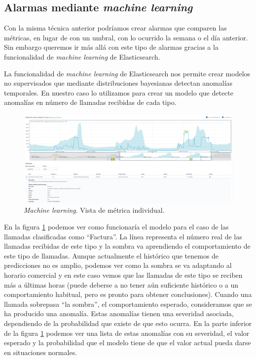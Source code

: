\subsection{Alarmas mediante \textit{machine learning}}
Con la misma técnica anterior podríamos crear alarmas que comparen las métricas, en lugar de con un umbral, con lo ocurrido la semana o el día anterior. Sin embargo queremos ir más allá con este tipo de alarmas gracias a la funcionalidad de \textit{machine learning} de Elasticsearch. 

La funcionalidad de \textit{machine learning} de Elasticsearch nos permite crear modelos no supervisados que mediante distribuciones bayesianas detectan anomalías temporales. En nuestro caso lo utilizamos para crear un modelo que detecte anomalías en número de llamadas recibidas de cada tipo.  



\begin{figure}[!ht]
	\centering
	\includegraphics[width=1\textwidth]{images/serv/ml-factura}
	\caption{\textit{Machine learning}. Vista de métrica individual.}
	\label{fig:mlfactura}
\end{figure}

En la figura \ref{fig:mlfactura} podemos ver como funcionaría el modelo para el caso de las llamadas clasificadas como ``Factura''. La línea representa el número real de las llamadas recibidas de este tipo y la sombra va aprendiendo el comportamiento de este tipo de llamadas.  Aunque actualmente el histórico que tenemos de predicciones no es amplio, podemos ver como la sombra se va adaptando al horario comercial y en este caso vemos que las llamadas de este tipo se reciben más a últimas horas (puede deberse a no tener aún suficiente histórico o a un comportamiento habitual, pero es pronto para obtener conclusiones). Cuando una llamada sobrepasa ``la sombra'', el comportamiento esperado, consideramos que se ha producido una anomalía.  Estas anomalías tienen una severidad asociada, dependiendo de la probabilidad que existe de que esto ocurra. En la parte inferior de la figura \ref{fig:mlfactura} podemos ver una lista de estas anomalías con su severidad, el valor esperado y la probabilidad que el modelo tiene de que el valor actual pueda darse en situaciones normales.  


